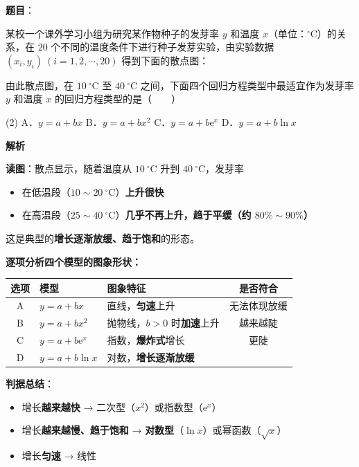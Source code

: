 \begin{answer}

\textbf{题目}：

某校一个课外学习小组为研究某作物种子的发芽率 $y$ 和温度 $x$（单位：$^\circ\mathrm C$）的关系，在 $20$ 个不同的温度条件下进行种子发芽实验，由实验数据 $\left(x_i,y_i\right)\ (i=1,2,\cdots,20)$ 得到下面的散点图：
\nopagebreak[4]
\begin{center}\end{center}
\nopagebreak[4]
由此散点图，在 $10\ ^\circ\mathrm C$ 至 $40\ ^\circ\mathrm C$ 之间，下面四个回归方程类型中最适宜作为发芽率 $y$ 和温度 $x$ 的回归方程类型的是\mbox{（　　）}

\begin{gkopts}(2)
\task A．$y=a+bx$
\task B．$y=a+bx^{2}$
\task C．$y=a+b\mathrm e^{x}$
\task D．$y=a+b\ln x$
\end{gkopts}

\textbf{解析}

\textbf{读图}：散点显示，随着温度从 $10\ ^\circ\mathrm C$ 升到 $40\ ^\circ\mathrm C$，发芽率
\begin{itemize}
\item 在低温段（$10\sim20\ ^\circ\mathrm C$）\textbf{上升很快}
\item 在高温段（$25\sim40\ ^\circ\mathrm C$）\textbf{几乎不再上升，趋于平缓（约 $80\%\sim90\%$）}
\end{itemize}

这是典型的\textbf{增长逐渐放缓、趋于饱和}的形态。

\textbf{逐项分析四个模型的图象形状：}

\begin{center}
\begin{tabular}{cllc}
\toprule
选项 & 模型 & 图象特征 & 是否符合 \\
\midrule
A & $y=a+bx$ & 直线，\textbf{匀速}上升 &  无法体现放缓 \\
B & $y=a+bx^{2}$ & 抛物线，$b>0$ 时\textbf{加速}上升 &  越来越陡 \\
C & $y=a+b\mathrm e^{x}$ & 指数，\textbf{爆炸式}增长 &  更陡 \\
D & $y=a+b\ln x$ & 对数，\textbf{增长逐渐放缓} &  \\
\bottomrule
\end{tabular}
\end{center}

\begin{gktip}
\textbf{判据总结}：
\begin{itemize}
\item 增长\textbf{越来越快} → 二次型（$x^2$）或指数型（$\mathrm e^{x}$）
\item 增长\textbf{越来越慢、趋于饱和} → \textbf{对数型}（$\ln x$）或幂函数（$\sqrt x$）
\item 增长\textbf{匀速} → 线性
\end{itemize}


\end{gktip}
\end{answer}
